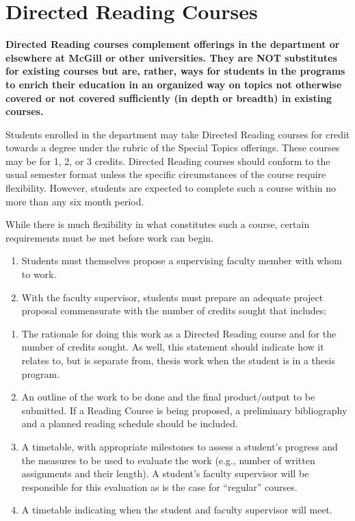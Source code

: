 \documentclass[
]{book}
\begin{document}
\hypertarget{directed-reading-courses-1}{%
\section{Directed Reading Courses}\label{directed-reading-courses-1}}

\textbf{Directed Reading courses complement offerings in the department or elsewhere at McGill or other universities. They are NOT substitutes for existing courses but are, rather, ways for students in the programs to enrich their education in an organized way on topics not otherwise covered or not covered sufficiently (in depth or breadth) in existing courses.}

Students enrolled in the department may take Directed Reading courses for credit towards a degree under the rubric of the Special Topics offerings. These courses may be for 1, 2, or 3 credits. Directed Reading courses should conform to the usual semester format unless the specific circumstances of the course require flexibility. However, students are expected to complete such a course within no more than any six month period.

While there is much flexibility in what constitutes such a course, certain requirements must be met before work can begin.

\begin{enumerate}
\def\labelenumi{\arabic{enumi}.}
\item
  Students must themselves propose a supervising faculty member with whom to work.
\item
  With the faculty supervisor, students must prepare an adequate project proposal commensurate with the number of credits sought that includes:
\end{enumerate}

\begin{enumerate}
\def\labelenumi{\alph{enumi}.}
\item
  The rationale for doing this work as a Directed Reading course and for the number of credits sought. As well, this statement should indicate how it relates to, but is separate from, thesis work when the student is in a thesis program.
\item
  An outline of the work to be done and the final product/output to be submitted. If a Reading Course is being proposed, a preliminary bibliography and a planned reading schedule should be included.
\item
  A timetable, with appropriate milestones to assess a student's progress and the measures to be used to evaluate the work (e.g., number of written assignments and their length). A student's faculty supervisor will be responsible for this evaluation as is the case for ``regular'' courses.
\item
  A timetable indicating when the student and faculty supervisor will meet.
\end{enumerate}
\end{document}
